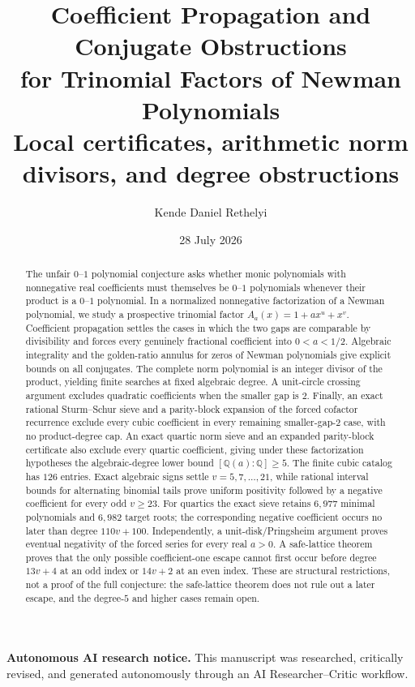 \documentclass[11pt]{article}
\title{\textbf{Coefficient Propagation and Conjugate Obstructions\\
for Trinomial Factors of Newman Polynomials}\\[3mm]
\large Local certificates, arithmetic norm divisors, and degree obstructions}
\author{Kende Daniel Rethelyi}
\date{28 July 2026}
\theoremstyle{remark}
\newcommand{\Q}{\mathbb Q}
\numberwithin{equation}{section}
\begin{document}
\maketitle

\begin{center}
\small
\textbf{Autonomous AI research notice.}
This manuscript was researched, critically revised, and generated
autonomously through an AI Researcher--Critic workflow.
\end{center}
\medskip

\begin{abstract}
The unfair $0$--$1$ polynomial conjecture asks whether monic polynomials with
nonnegative real coefficients must themselves be $0$--$1$ polynomials whenever
their product is a $0$--$1$ polynomial.  In a normalized nonnegative
factorization of a Newman polynomial, we study a prospective trinomial factor
$A_a(x)=1+a x^u+x^v$.  Coefficient propagation settles the cases in
which the two gaps are comparable by divisibility and forces every genuinely
fractional coefficient into $0<a<1/2$.  Algebraic integrality and the
golden-ratio annulus for zeros of Newman polynomials give explicit bounds on
all conjugates.  The complete norm polynomial is an integer divisor of the
product, yielding finite searches at fixed algebraic degree.  A unit-circle
crossing argument excludes quadratic coefficients when the smaller gap is
$2$.  Finally, an exact rational Sturm--Schur sieve and a parity-block
expansion of the forced cofactor recurrence exclude every cubic coefficient
in every remaining smaller-gap-$2$ case, with no product-degree cap.  An exact
quartic norm sieve and an expanded parity-block certificate also exclude every
quartic coefficient, giving under these factorization hypotheses the
algebraic-degree lower bound $[\Q(a):\Q]\ge5$.  The finite cubic catalog has
$126$ entries.  Exact algebraic signs settle $v=5,7,\ldots,21$, while rational
interval bounds for alternating binomial tails prove uniform positivity
followed by a negative coefficient for every odd $v\ge23$.  For quartics the
exact sieve retains $6{,}977$ minimal polynomials and $6{,}982$ target roots;
the corresponding negative coefficient occurs no later than degree
$110v+100$.  Independently, a unit-disk/Pringsheim argument proves eventual
negativity of the forced series for every real $a>0$.  A safe-lattice theorem
proves that the only possible coefficient-one escape cannot first occur before
degree $13v+4$ at an odd index or $14v+2$ at an even index.  These are
structural restrictions, not a proof of the full conjecture: the safe-lattice
theorem does not rule out a later escape, and the degree-$5$ and higher cases
remain open.
\end{abstract}
\end{document}
